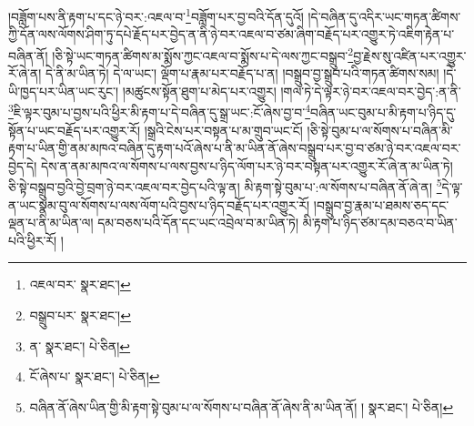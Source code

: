 །བཟློག་པས་ནི་རྟག་པ་དང་ཉེ་བར་:འཇལ་བ་\footnote{འཇལ་བར་  སྣར་ཐང་། }བཟློག་པར་བྱ་བའི་དོན་དུའོ། །དེ་བཞིན་དུ་འདིར་ཡང་གཏན་ཚིགས་ཀྱི་དོན་ལས་ལོགས་ཤིག་ཏུ་དཔེ་རྗོད་པར་བྱེད་ན་ནི་ཉེ་བར་འཇལ་བ་ཙམ་ཞིག་བརྗོད་པར་འགྱུར་ཏེ་འཇིག་རྟེན་པ་བཞིན་ནོ། །ཅི་སྟེ་ཡང་གཏན་ཚིགས་མ་སྨོས་ཀྱང་འཇལ་བ་སྨོས་པ་དེ་ལས་ཀྱང་བསྒྲུབ་\footnote{བསྒྲུབ་པར་  སྣར་ཐང་། }བྱ་རྗེས་སུ་འཛིན་པར་འགྱུར་རོ་ཞེ་ན། དེ་ནི་མ་ཡིན་ཏེ། དེ་ལ་ཡང་། ལྡོག་པ་རྣམ་པར་བརྗོད་པ་ན། །བསྒྲུབ་བྱ་སྒྲུབ་པའི་གཏན་ཚིགས་སམ། །དེ་ཡི་ཁྱད་པར་ཡིན་ཡང་རུང་། །མཚུངས་སྟོན་ཐུག་པ་མེད་པར་འགྱུར། །གལ་ཏེ་དེ་ལྟར་ཉེ་བར་འཇལ་བར་བྱེད་:ན་ནི་\footnote{ན་  སྣར་ཐང་།  པེ་ཅིན། }ཇི་ལྟར་བུམ་པ་བྱས་པའི་ཕྱིར་མི་རྟག་པ་དེ་བཞིན་དུ་སྒྲ་ཡང་:ངོ་ཞེས་བྱ་བ་\footnote{ངོ་ཞེས་པ་  སྣར་ཐང་།  པེ་ཅིན། }བཞིན་ཡང་བུམ་པ་མི་རྟག་པ་ཉིད་དུ་སྟོན་པ་ཡང་བརྗོད་པར་འགྱུར་རོ། །སྒྲའི་ངེས་པར་བསྟན་པ་མ་གྲུབ་ཡང་ངོ། །ཅི་སྟེ་བུམ་པ་ལ་སོགས་པ་བཞིན་མི་རྟག་པ་ཡིན་གྱི་ནམ་མཁའ་བཞིན་དུ་རྟག་པའོ་ཞེས་པ་ནི་མ་ཡིན་ནོ་ཞེས་བསྒྲུབ་པར་བྱ་བ་ཙམ་ཉེ་བར་འཇལ་བར་བྱེད་དེ། དེས་ན་ནམ་མཁའ་ལ་སོགས་པ་ལས་བྱས་པ་ཉིད་ལོག་པར་ཉེ་བར་བསྟན་པར་འགྱུར་རོ་ཞེ་ན་མ་ཡིན་ཏེ། ཅི་སྟེ་བསྒྲུབ་བྱའི་བྱེ་བྲག་ཉེ་བར་འཇལ་བར་བྱེད་པའི་ལྟ་ན། མི་རྟག་སྟེ་བུམ་པ་:ལ་སོགས་པ་བཞིན་ནོ་ཞེ་ན། \footnote{བཞིན་ནོ་ཞེས་ཡིན་གྱི་མི་རྟག་སྟེ་བུམ་པ་ལ་སོགས་པ་བཞིན་ནོ་ཞེས་ནི་མ་ཡིན་ནོ། །   སྣར་ཐང་།  པེ་ཅིན། }དེ་ལྟ་ན་ཡང་སྣམ་བུ་ལ་སོགས་པ་ལས་ལོག་པའི་བྱས་པ་ཉིད་བརྗོད་པར་འགྱུར་རོ། །བསྒྲུབ་བྱ་རྣམ་པ་ཐམས་ཅད་དང་ལྡན་པ་ནི་མ་ཡིན་ལ། དམ་བཅས་པའི་དོན་དང་ཡང་འབྲེལ་བ་མ་ཡིན་ཏེ། མི་རྟག་པ་ཉིད་ཙམ་དམ་བཅའ་བ་ཡིན་པའི་ཕྱིར་རོ། །
